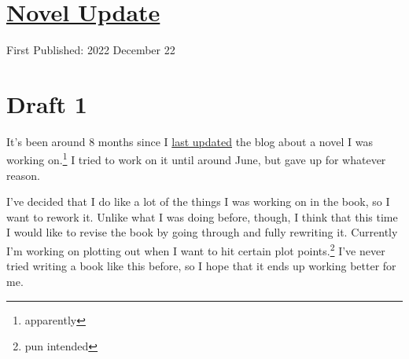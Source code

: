 \documentclass[12pt]{article}[titlepage]
\newcommand{\1}{\={a}}
\newcommand{\2}{\={e}}
\newcommand{\3}{\={\i}}
\newcommand{\4}{\=o}
\newcommand{\5}{\=u}
\newcommand{\6}{\={A}}
\renewcommand{\,}{\textsuperscript{,}}
\begin{document}
\doublespacing
\section{\href{novel-update-7.html}{Novel Update}}
First Published: 2022 December 22


\section{Draft 1}
It's been around 8 months since I \href{novel-update-6.html}{last updated} the blog about a novel I was working on.\footnote{apparently}
I tried to work on it until around June, but gave up for whatever reason.

I've decided that I do like a lot of the things I was working on in the book, so I want to rework it.
Unlike what I was doing before, though, I think that this time I would like to revise the book by going through and fully rewriting it.
Currently I'm working on plotting out when I want to hit certain plot points.\footnote{pun intended}
I've never tried writing a book like this before, so I hope that it ends up working better for me.
\end{document}

